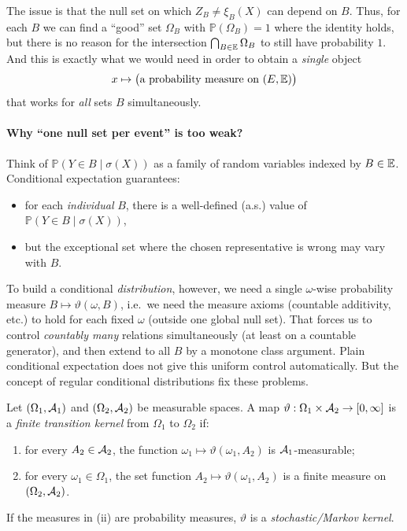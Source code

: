 The issue is that the null set on which $Z_B\neq \xi_B(X)$ can depend on $B$.
Thus, for each $B$ we can find a ``good'' set $\Omega_B$ with $\mathbb{P}(\Omega_B)=1$ where the identity holds,
but there is no reason for the intersection $\bigcap_{B\in\mathbb{E}}\Omega_B$ to still have probability $1$.
And this is exactly what we would need in order to obtain a \emph{single} object
\[
x\mapsto \big(\text{a probability measure on }(E,\mathbb{E})\big)
\]
that works for \emph{all} sets $B$ simultaneously.

\paragraph{Why ``one null set per event'' is too weak?}
Think of $\mathbb{P}(Y\in B\mid \sigma(X))$ as a family of random variables indexed by $B\in\mathbb{E}$.
Conditional expectation guarantees:
\begin{itemize}
\item for each \emph{individual} $B$, there is a well-defined (a.s.) value of $\mathbb{P}(Y\in B\mid \sigma(X))$,
\item but the exceptional set where the chosen representative is wrong may vary with $B$.
\end{itemize}
To build a conditional \emph{distribution}, however, we need a single $\omega$-wise probability measure
$B\mapsto \vartheta(\omega,B)$, i.e.\ we need the measure axioms (countable additivity, etc.) to hold
for each fixed $\omega$ (outside one global null set).
That forces us to control \emph{countably many} relations simultaneously (at least on a countable generator),
and then extend to all $B$ by a monotone class argument.
Plain conditional expectation does not give this uniform control automatically. But the concept of regular conditional distributions fix these problems.

\begin{definition}
\label{def:kernel}
Let $(\Omega_1,\mathcal{A}_1)$ and $(\Omega_2,\mathcal{A}_2)$ be measurable spaces.
A map $\vartheta:\Omega_1\times \mathcal{A}_2\to [0,\infty]$ is a \emph{finite transition kernel} from $\Omega_1$ to $\Omega_2$ if:
\begin{enumerate}[label=(\roman*)]
\item for every $A_2\in\mathcal{A}_2$, the function $\omega_1\mapsto \vartheta(\omega_1,A_2)$ is $\mathcal{A}_1$-measurable;
\item for every $\omega_1\in\Omega_1$, the set function $A_2\mapsto \vartheta(\omega_1,A_2)$ is a finite measure on $(\Omega_2,\mathcal{A}_2)$.
\end{enumerate}
If the measures in (ii) are probability measures, $\vartheta$ is a \emph{stochastic/Markov kernel}.
\end{definition}


